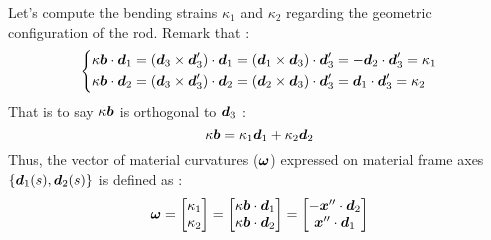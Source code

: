 Let’s compute the bending strains $\kappa_1$ and $\kappa_2$ regarding the geometric configuration of the rod. Remark that :
\begin{equation}
	\left\{
	\begin{aligned}
	&\kappa\boldsymbol{b}\cdot\boldsymbol{d}_1 = (\boldsymbol{d}_3\times\boldsymbol{d}'_3)\cdot\boldsymbol{d}_1 = (\boldsymbol{d}_1\times\boldsymbol{d}_3)\cdot\boldsymbol{d}'_3 = -\boldsymbol{d}_2\cdot\boldsymbol{d}'_3 = \kappa_1 \\
	&\kappa\boldsymbol{b}\cdot\boldsymbol{d}_2 = (\boldsymbol{d}_3\times\boldsymbol{d}'_3)\cdot\boldsymbol{d}_2 = (\boldsymbol{d}_2\times\boldsymbol{d}_3)\cdot\boldsymbol{d}'_3 = \boldsymbol{d}_1\cdot\boldsymbol{d}'_3 = \kappa_2	
	\end{aligned}
	\right.
\end{equation}
That is to say $\kappa\boldsymbol{b}$ is orthogonal to $\boldsymbol{d}_3$ :
\begin{equation}
	\kappa\boldsymbol{b} = \kappa_1\boldsymbol{d}_1 +   \kappa_2\boldsymbol{d}_2
\end{equation}
Thus, the vector of material curvatures ($\boldsymbol{\omega}$) expressed on material frame axes $\{\boldsymbol{d}_1(s),\boldsymbol{d}_2(s)\}$ is defined as :
\begin{equation}
	\boldsymbol{\omega} =
	\begin{bmatrix}
		\kappa_1\\
		\kappa_2\\
	\end{bmatrix} =
	\begin{bmatrix}
		\kappa\boldsymbol{b}\cdot\boldsymbol{d}_1\\
		\kappa\boldsymbol{b}\cdot\boldsymbol{d}_2\\
	\end{bmatrix} =
		\begin{bmatrix}
		-\boldsymbol{x}''\cdot\boldsymbol{d}_2\\
		\boldsymbol{x}''\cdot\boldsymbol{d}_1\\
	\end{bmatrix}
\end{equation}


